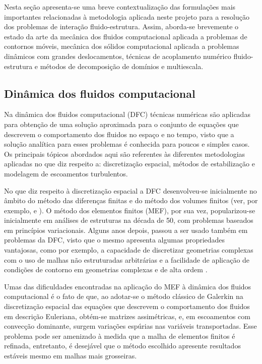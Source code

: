 \documentclass[tese_patricia.tex]{subfiles}
\begin{document}
Nesta seção apresenta-se uma breve contextualização das formulações mais importantes relacionadas à metodologia aplicada neste projeto para a resolução dos problemas de interação fluido-estrutura. Assim, aborda-se brevemente o estado da arte da mecânica dos fluidos computacional aplicada a problemas de contornos móveis, mecânica dos sólidos computacional aplicada a problemas dinâmicos com grandes deslocamentos, técnicas de acoplamento numérico fluido-estrutura e métodos de decomposição de domínios e multiescala.

\subsection{Dinâmica dos fluidos computacional}
\label{cfdsection}

Na dinâmica dos fluidos computacional (DFC) técnicas numéricas são aplicadas para obtenção de uma solução aproximada para o conjunto de equações que descrevem o comportamento dos fluidos no espaço e no tempo, visto que a solução analítica para esses problemas é conhecida para poucos e simples casos. Os principais tópicos abordados aqui são referentes às diferentes metodologias aplicadas no que  diz respeito a: discretização espacial, métodos de estabilização e modelagem de escoamentos turbulentos. 

No que diz respeito à discretização espacial a DFC desenvolveu-se inicialmente no âmbito do método das diferenças finitas e do método dos volumes finitos (ver, por exemplo,  e ). O método dos elementos finitos (MEF), por sua vez, popularizou-se inicialmente em análises de estruturas na década de 50, com problemas baseados em princípios variacionais. Alguns anos depois, passou a ser usado também em problemas da DFC, visto que o mesmo apresenta algumas propriedades vantajosas, como por exemplo, a capacidade de discretizar geometrias complexas com o uso de malhas não estruturadas arbitrárias e a facilidade de aplicação de condições de contorno em geometrias complexas e de alta ordem \cite{ZienkiewiczTN:2005,ReddyG:2000}.

Umas das dificuldades encontradas na aplicação do MEF à dinâmica dos fluidos computacional é o fato de que, ao adotar-se o método clássico de Galerkin na discretização espacial das equações que descrevem o comportamento dos fluidos em descrição Euleriana, obtém-se matrizes assimétricas, e, em escoamentos com convecção dominante, surgem variações espúrias nas variáveis transportadas. Esse problema pode ser amenizado à medida que a malha de elementos finitos é refinada, entretanto, é desejável que o método escolhido apresente resultados estáveis mesmo em malhas mais grosseiras.
\end{document}
